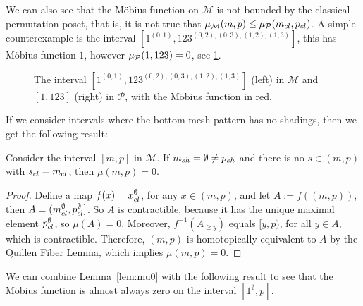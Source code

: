 \documentclass[11pt,a4paper,oneside]{article}
\begin{document}
We can also see that the M\"obius function on $\mathcal{M}$ is not bounded by
the classical permutation poset, that is, it is not true that $\operatorname{\mu_\mathcal{M}}(m,p)\le
\operatorname{\mu_\mathcal{P}}(m_{cl},p_{cl})$. A simple counterexample is the interval
$[1^{(0,1)},123^{(0,2),(0,3),(1,2),(1,3)}]$, this has M\"obius function $1$,
however $\operatorname{\mu_\mathcal{P}}(1,123)=0$, see \cref{fig:1-123}.

\begin{figure}\centering
{}
\caption{The interval $[1^{(0,1)},123^{(0,2),(0,3),(1,2),(1,3)}]$
(left) in $\mathcal{M}$ and $[1,123]$ (right) in $\mathcal{P}$,
with the M\"obius function in red.}\label{fig:1-123}
\end{figure}

If we consider intervals where the bottom mesh pattern has no shadings, then we
get the following result:
\begin{lem}\label{lem:mu0}
Consider the interval $[m,p]$ in $\mathcal{M}$. If $m_{sh}=\emptyset\not=p_{sh}$
and there is no $s\in(m,p)$ with $s_{cl}=m_{cl}$, then $\mu(m,p)=0$.
\begin{proof}
Define a map $f(x)=x_{cl}^\emptyset$, for any $x\in(m,p)$, and let $A:=f((m,p))$, then $A=(m_{cl}^\emptyset,p_{cl}^{\emptyset}]$.
So  $A$ is contractible, because it has the
unique maximal element $p_{cl}^\emptyset$, so $\mu(A)=0$. Moreover, $f^{-1}(A_{\ge y})$
equals $[y,p)$, for all $y\in A$, which is contractible. Therefore, $(m,p)$ is homotopically equivalent
to $A$ by the Quillen Fiber Lemma, which implies $\mu(m,p)=0$.
\end{proof}
\end{lem}

We can combine Lemma~\ref{lem:mu0} with the following result to see that the
M\"obius function is almost always zero on the interval $[1^\emptyset,p]$.
\end{document}
